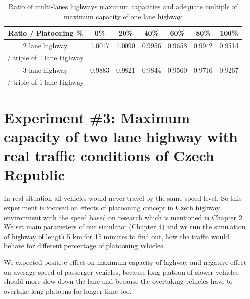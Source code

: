 \begin{table}[ht]
\begin{centering}
\begin{tabular}{|c|c|c|c|c|c|c|}
\hline 
Ratio / Platooning \% &	0\% &	20\% &	40\% &	60\% &	80\% &	100\%\tabularnewline
\hline 
2 lane highway &	1.0017 &	1.0090 &	0.9956 &	0.9658 &	0.9942 &	0.9514\tabularnewline
/ triple of 1 lane highway & & & & & &\tabularnewline
\hline 
3 lane highway &	0.9883 &	0.9821 &	0.9844 &	0.9560 &	0.9716 &	0.9267\tabularnewline
/ triple of 1 lane highway & & & & & &\tabularnewline
\hline 
\end{tabular}
\centering
\protect\caption{\label{tab:5_2-2}Ratio of multi-lanes highways maximum capacities and adequate multiple of maximum capacity of one lane highway}
\end{centering}
\end{table}



















\section[Experiment \#3: Maximum capacity of two lane highway with real traffic conditions of Czech Republic]{Experiment \#3: Maximum capacity of two lane highway with real traffic conditions of Czech Republic}


In real situation all vehicles would never travel by  the same speed level. So this experiment is focused on effects of platooning concept in Czech highway environment with the speed based on research which is mentioned in Chapter 2. We set main parameters of our simulator (Chapter 4) and we run the simulation of highway of length 5 km for 15 minutes to find out, how the traffic would behave for different percentage of platooning vehicles. 

We expected positive effect on maximum capacity of highway and negative effect on average speed of passenger vehicles, because long platoon of slower vehicles should more slow down the lane and because the overtaking vehicles have to overtake long platoons for longer time too. 






